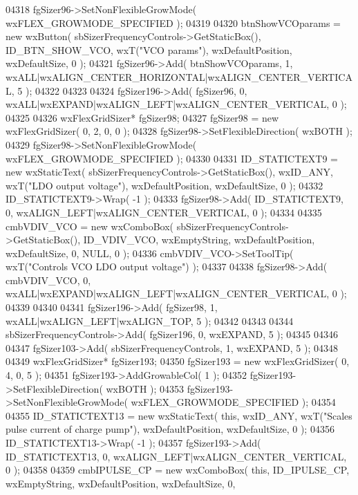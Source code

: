 \begin{DoxyCode}
04318     fgSizer96->SetNonFlexibleGrowMode( wxFLEX\_GROWMODE\_SPECIFIED );
04319     
04320     btnShowVCOparams = \textcolor{keyword}{new} wxButton( sbSizerFrequencyControls->GetStaticBox(), 
      ID_BTN_SHOW_VCO, wxT(\textcolor{stringliteral}{"VCO params"}), wxDefaultPosition, wxDefaultSize, 0 );
04321     fgSizer96->Add( btnShowVCOparams, 1, wxALL|wxALIGN\_CENTER\_HORIZONTAL|wxALIGN\_CENTER\_VERTICAL, 5 );
04322     
04323     
04324     fgSizer196->Add( fgSizer96, 0, wxALL|wxEXPAND|wxALIGN\_LEFT|wxALIGN\_CENTER\_VERTICAL, 0 );
04325     
04326     wxFlexGridSizer* fgSizer98;
04327     fgSizer98 = \textcolor{keyword}{new} wxFlexGridSizer( 0, 2, 0, 0 );
04328     fgSizer98->SetFlexibleDirection( wxBOTH );
04329     fgSizer98->SetNonFlexibleGrowMode( wxFLEX\_GROWMODE\_SPECIFIED );
04330     
04331     ID_STATICTEXT9 = \textcolor{keyword}{new} wxStaticText( sbSizerFrequencyControls->GetStaticBox(), wxID\_ANY, wxT(\textcolor{stringliteral}{"LDO output
       voltage"}), wxDefaultPosition, wxDefaultSize, 0 );
04332     ID_STATICTEXT9->Wrap( -1 );
04333     fgSizer98->Add( ID_STATICTEXT9, 0, wxALIGN\_LEFT|wxALIGN\_CENTER\_VERTICAL, 0 );
04334     
04335     cmbVDIV_VCO = \textcolor{keyword}{new} wxComboBox( sbSizerFrequencyControls->GetStaticBox(), 
      ID_VDIV_VCO, wxEmptyString, wxDefaultPosition, wxDefaultSize, 0, NULL, 0 ); 
04336     cmbVDIV_VCO->SetToolTip( wxT(\textcolor{stringliteral}{"Controls VCO LDO output voltage"}) );
04337     
04338     fgSizer98->Add( cmbVDIV_VCO, 0, wxALL|wxEXPAND|wxALIGN\_LEFT|wxALIGN\_CENTER\_VERTICAL, 0 );
04339     
04340     
04341     fgSizer196->Add( fgSizer98, 1, wxALL|wxALIGN\_LEFT|wxALIGN\_TOP, 5 );
04342     
04343     
04344     sbSizerFrequencyControls->Add( fgSizer196, 0, wxEXPAND, 5 );
04345     
04346     
04347     fgSizer103->Add( sbSizerFrequencyControls, 1, wxEXPAND, 5 );
04348     
04349     wxFlexGridSizer* fgSizer193;
04350     fgSizer193 = \textcolor{keyword}{new} wxFlexGridSizer( 0, 4, 0, 5 );
04351     fgSizer193->AddGrowableCol( 1 );
04352     fgSizer193->SetFlexibleDirection( wxBOTH );
04353     fgSizer193->SetNonFlexibleGrowMode( wxFLEX\_GROWMODE\_SPECIFIED );
04354     
04355     ID_STATICTEXT13 = \textcolor{keyword}{new} wxStaticText( \textcolor{keyword}{this}, wxID\_ANY, wxT(\textcolor{stringliteral}{"Scales pulse current of charge pump"}), 
      wxDefaultPosition, wxDefaultSize, 0 );
04356     ID_STATICTEXT13->Wrap( -1 );
04357     fgSizer193->Add( ID_STATICTEXT13, 0, wxALIGN\_LEFT|wxALIGN\_CENTER\_VERTICAL, 0 );
04358     
04359     cmbIPULSE_CP = \textcolor{keyword}{new} wxComboBox( \textcolor{keyword}{this}, ID_IPULSE_CP, wxEmptyString, wxDefaultPosition, wxDefaultSize, 0, 

\end{DoxyCode}
